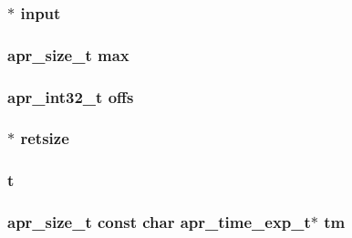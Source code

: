 \subsubsection[{\texorpdfstring{input}{input}}]{$\ast$ input}\hypertarget{group__apr__time_gaca34a9326ce6f26f5d16d40a11515925}{}\label{group__apr__time_gaca34a9326ce6f26f5d16d40a11515925}
\subsubsection[{\texorpdfstring{max}{max}}]{ {\bf apr\+\_\+size\+\_\+t} max}\hypertarget{group__apr__time_gabd53dba8aa2b6aef034e67569fedebfc}{}\label{group__apr__time_gabd53dba8aa2b6aef034e67569fedebfc}
\subsubsection[{\texorpdfstring{offs}{offs}}]{ {\bf apr\+\_\+int32\+\_\+t} offs}\hypertarget{group__apr__time_ga9bcfe551980c06f6cc21a62387c90920}{}\label{group__apr__time_ga9bcfe551980c06f6cc21a62387c90920}
\subsubsection[{\texorpdfstring{retsize}{retsize}}]{$\ast$ retsize}\hypertarget{group__apr__time_gad002c9861f62c612b3224a3b98253b31}{}\label{group__apr__time_gad002c9861f62c612b3224a3b98253b31}
\subsubsection[{\texorpdfstring{t}{t}}]{ t}\hypertarget{group__apr__time_gabfa74bb4f05f3b2de1a89160025e5400}{}\label{group__apr__time_gabfa74bb4f05f3b2de1a89160025e5400}
\subsubsection[{\texorpdfstring{tm}{tm}}]{ {\bf apr\+\_\+size\+\_\+t} const char {\bf apr\+\_\+time\+\_\+exp\+\_\+t}$\ast$ tm}\hypertarget{group__apr__time_ga3ea988e6273ca725c8210dcfdc48402f}{}\label{group__apr__time_ga3ea988e6273ca725c8210dcfdc48402f}
